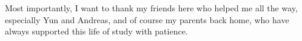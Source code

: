 Most importantly, I want to thank my friends here who helped me all the way, especially Yun and Andreas, and of course my parents back home, who have always supported this life of study with patience.







